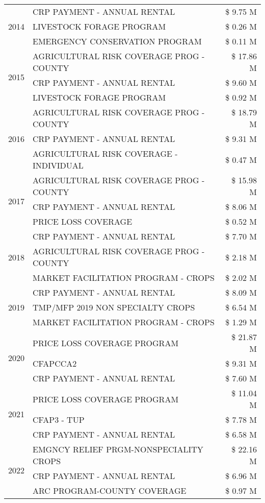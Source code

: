 \begin{tabular}{llr}
\cline{1-3}
\multirow[t]{3}{*}{2014} & CRP PAYMENT - ANNUAL RENTAL & \$ 9.75 M \\
 & LIVESTOCK FORAGE PROGRAM & \$ 0.26 M \\
 & EMERGENCY CONSERVATION PROGRAM & \$ 0.11 M \\
\cline{1-3}
\multirow[t]{3}{*}{2015} & AGRICULTURAL RISK COVERAGE PROG - COUNTY & \$ 17.86 M \\
 & CRP PAYMENT - ANNUAL RENTAL & \$ 9.60 M \\
 & LIVESTOCK FORAGE PROGRAM & \$ 0.92 M \\
\cline{1-3}
\multirow[t]{3}{*}{2016} & AGRICULTURAL RISK COVERAGE PROG - COUNTY & \$ 18.79 M \\
 & CRP PAYMENT - ANNUAL RENTAL & \$ 9.31 M \\
 & AGRICULTURAL RISK COVERAGE - INDIVIDUAL & \$ 0.47 M \\
\cline{1-3}
\multirow[t]{3}{*}{2017} & AGRICULTURAL RISK COVERAGE PROG - COUNTY & \$ 15.98 M \\
 & CRP PAYMENT - ANNUAL RENTAL & \$ 8.06 M \\
 & PRICE LOSS COVERAGE & \$ 0.52 M \\
\cline{1-3}
\multirow[t]{3}{*}{2018} & CRP PAYMENT - ANNUAL RENTAL & \$ 7.70 M \\
 & AGRICULTURAL RISK COVERAGE PROG - COUNTY & \$ 2.18 M \\
 & MARKET FACILITATION PROGRAM - CROPS & \$ 2.02 M \\
\cline{1-3}
\multirow[t]{3}{*}{2019} & CRP PAYMENT - ANNUAL RENTAL & \$ 8.09 M \\
 & TMP/MFP 2019 NON SPECIALTY CROPS & \$ 6.54 M \\
 & MARKET FACILITATION PROGRAM - CROPS & \$ 1.29 M \\
\cline{1-3}
\multirow[t]{3}{*}{2020} & PRICE LOSS COVERAGE PROGRAM & \$ 21.87 M \\
 & CFAPCCA2 & \$ 9.31 M \\
 & CRP PAYMENT - ANNUAL RENTAL & \$ 7.60 M \\
\cline{1-3}
\multirow[t]{3}{*}{2021} & PRICE LOSS COVERAGE PROGRAM & \$ 11.04 M \\
 & CFAP3 - TUP & \$ 7.78 M \\
 & CRP PAYMENT - ANNUAL RENTAL & \$ 6.58 M \\
\cline{1-3}
\multirow[t]{3}{*}{2022} & EMGNCY RELIEF PRGM-NONSPECIALITY CROPS & \$ 22.16 M \\
 & CRP PAYMENT - ANNUAL RENTAL & \$ 6.96 M \\
 & ARC PROGRAM-COUNTY COVERAGE & \$ 0.97 M \\
\cline{1-3}
\bottomrule
\end{tabular}
